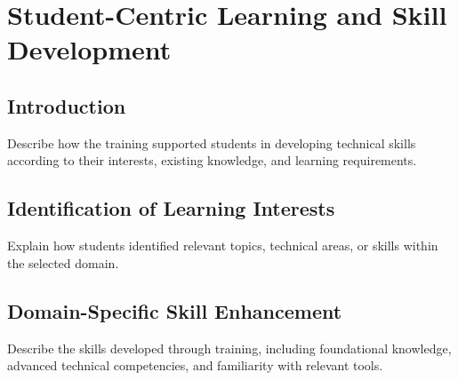 \chapter{Student-Centric Learning and Skill Development}

\section{Introduction}
Describe how the training supported students in developing technical skills according to their interests, existing knowledge, and learning requirements.

\section{Identification of Learning Interests}
Explain how students identified relevant topics, technical areas, or skills within the selected domain.

\section{Domain-Specific Skill Enhancement}

Describe the skills developed through training, including foundational knowledge, advanced technical competencies, and familiarity with relevant tools.